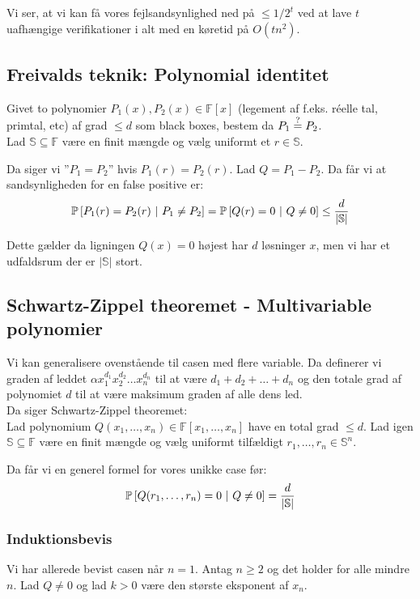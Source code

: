 Vi ser, at vi kan få vores fejlsandsynlighed ned på $\leq 1/2^t$ ved at lave $t$ uafhængige verifikationer i alt med en køretid på $O(t n^2)$.


\subsection{Freivalds teknik: Polynomial identitet}
Givet to polynomier $P_1(x), P_2(x) \in \mathbb F[x]$ (legement af f.eks. réelle tal, primtal, etc) af grad $\leq d$ som black boxes, bestem da $P_1 \stackrel{?}{=} P_2$.\\

Lad $\mathbb S \subseteq \mathbb F$ være en finit mængde og vælg uniformt et $r \in \mathbb S$.

Da siger vi ''$P_1 = P_2$'' hvis $P_1(r) = P_2(r)$. Lad $Q = P_1 - P_2$. Da får vi at sandsynligheden for en false positive er:
$$
  \P{P_1(r) = P_2(r) \ | P_1 \neq P_2} = \P{Q(r) = 0 \ | Q \neq 0} \leq \frac{d}{|\mathbb S|}
$$

Dette gælder da ligningen $Q(x) = 0$ højest har $d$ løsninger $x$, men vi har et udfaldsrum der er $|\mathbb{S}|$ stort.

\subsection{Schwartz-Zippel theoremet - Multivariable polynomier}
Vi kan generalisere ovenstående til casen med flere variable. Da definerer vi graden af leddet $\alpha x_1^{d_1} x_2^{d_2} \dots x_n^{d_n}$ til at være $d_1 + d_2 + \dots + d_n$ og den totale grad af polynomiet $d$ til at være maksimum graden af alle dens led.\\

Da siger Schwartz-Zippel theoremet:\\
Lad polynomium $Q(x_1, \dots, x_n) \in \mathbb F[x_1, \dots, x_n]$ have en total grad $\leq d$. Lad igen $\mathbb S \subseteq \mathbb F$ være en finit mængde og vælg uniformt tilfældigt $r_1, \dots, r_n \in \mathbb S^n$.

Da får vi en generel formel for vores unikke case før:
$$
  \P{Q(r_1, \dots, r_n) = 0 \ | Q \neq 0} = \frac{d}{|\mathbb S|}
$$


\subsubsection{Induktionsbevis}
Vi har allerede bevist casen når $n = 1$. Antag $n \geq 2$ og det holder for alle mindre $n$. Lad $Q \neq 0$ og lad $k > 0$ være den største eksponent af $x_n$.\\

